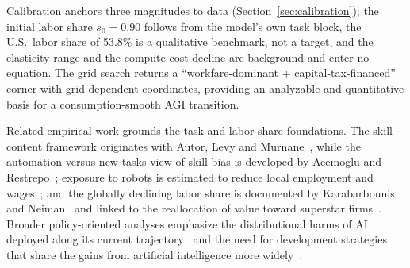 \documentclass[review,12pt]{elsarticle}
\theoremstyle{plain}
\theoremstyle{definition}
\theoremstyle{remark}
\begin{document}
Calibration anchors three magnitudes to data (Section~\ref{sec:calibration}); the initial labor share $s_0=0.90$ follows from the model's own task block, the U.S.\ labor share of 53.8\% is a qualitative benchmark, not a target, and the elasticity range and the compute-cost decline are background and enter no equation. The grid search returns a ``workfare-dominant + capital-tax-financed'' corner with grid-dependent coordinates, providing an analyzable and quantitative basis for a consumption-smooth AGI transition.

Related empirical work grounds the task and labor-share foundations. The skill-content framework originates with Autor, Levy and Murnane~\cite{ALM2003}, while the automation-versus-new-tasks view of skill bias is developed by Acemoglu and Restrepo~\cite{AR2020pandp}; exposure to robots is estimated to reduce local employment and wages~\cite{AR2020}; and the globally declining labor share is documented by Karabarbounis and Neiman~\cite{KN2014} and linked to the reallocation of value toward superstar firms~\cite{ADKPV2020}. Broader policy-oriented analyses emphasize the distributional harms of AI deployed along its current trajectory~\cite{Acemoglu2021} and the need for development strategies that share the gains from artificial intelligence more widely~\cite{KS2021}.
\end{document}
